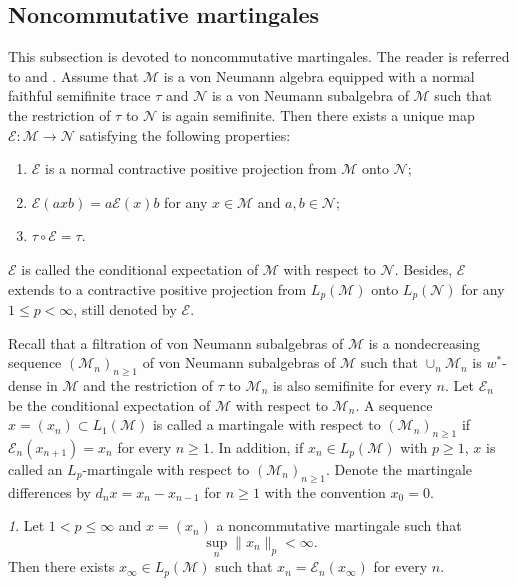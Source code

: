 \documentclass[oneside,english,a4wide]{amsart}
\numberwithin{equation}{section}
\numberwithin{figure}{section}
\theoremstyle{plain}
\theoremstyle{plain}
\theoremstyle{definition}
\theoremstyle{plain}
\theoremstyle{remark}
\newtheorem{rem}[thm]{\protect\remarkname}
\theoremstyle{definition}
\theoremstyle{remark}
\theoremstyle{definition}
\providecommand{\remarkname}{Remark}
\newcommand{\M}{{\mathcal M}}
\newcommand{\N}{{\mathcal N}}
\newcommand{\8}{\infty}
\begin{document}
\subsection{Noncommutative martingales}\label{sec2.2} This subsection is devoted to noncommutative martingales. The reader is referred to \cite{PX} and \cite{bookXu}. Assume that $\mathcal{M}$ is a von Neumann algebra equipped with a normal faithful semifinite trace $\tau$ and $\mathcal{N}$ is a von Neumann subalgebra of $\mathcal{M}$ such that the restriction of $\tau$ to $\mathcal{N}$ is again semifinite. Then there exists a unique map $\mathcal{E}: \mathcal{M}\to\mathcal{N}$ satisfying the following properties:
\begin{enumerate}
	\item $\mathcal{E}$ is a normal contractive positive projection from $\mathcal{M}$ onto $\mathcal{N}$;
	\item $\mathcal{E}(axb)=a\mathcal{E}(x)b$ for any $x\in\mathcal{M}$ and $a,b\in\mathcal{N}$;
	\item $\tau \circ\mathcal{E}=\tau$.
\end{enumerate}
$\mathcal{E}$ is called the conditional expectation of $\mathcal{M}$ with respect to $\mathcal{N}$. Besides, $\mathcal{E}$ extends to a contractive positive projection from $L_p(\M)$ onto $L_p(\N)$ for any $1\leq p<\8$, still denoted by $\mathcal{E}$.

Recall that a filtration of von Neumann subalgebras of $\mathcal{M}$ is a nondecreasing sequence $(\mathcal{M}_n)_{n\ge 1}$ of von Neumann subalgebras of $\mathcal{M}$ such that $\cup_n\mathcal{M}_n$ is $w^*$-dense in $\mathcal{M}$ and the restriction of $\tau$ to $\mathcal{M}_n$ is also semifinite for every $n$. Let $\mathcal{E}_n$ be the conditional expectation of $\M$ with respect to $\M_n$. A sequence $x=(x_n)\subset L_1(\mathcal{M})$ is called a martingale with respect to $(\mathcal{M}_n)_{n\ge 1}$ if $\mathcal{E}_n(x_{n+1})=x_n$ for every $n\ge 1$. In addition, if $x_n\in L_p(\mathcal{M})$ with $p\ge 1$, $x$ is called an $L_p$-martingale with respect to $(\mathcal{M}_n)_{n\ge 1}$. Denote the martingale differences by $d_nx=x_n-x_{n-1}$ for $n\geq 1$ with the convention $x_0=0$. 

\begin{rem}\label{conmar}
	Let $1<p\leq \8$ and $x=(x_n)$ a noncommutative martingale such that
	$$ \sup_n \|x_n\|_p <\8.  $$
	Then there exists $x_{\infty} \in L_p(\mathcal{M})$ such that $x_n=\mathcal{E}_n\left(x_{\infty}\right)$ for every $n$.
\end{rem}
\end{document}
